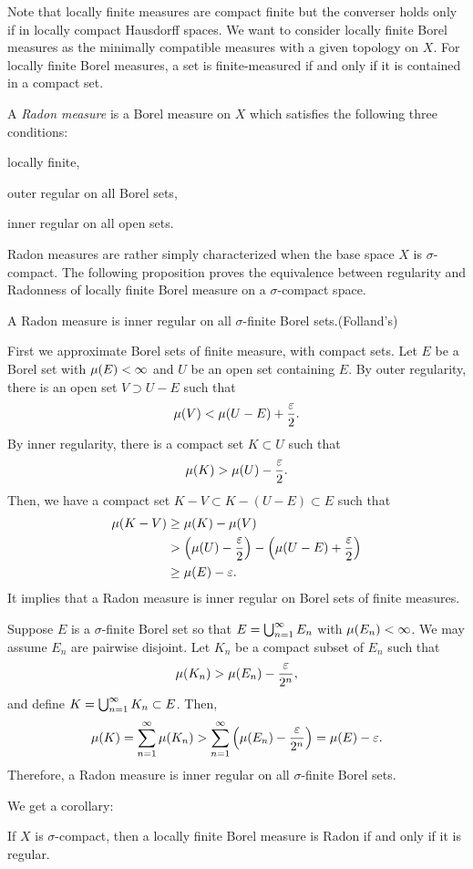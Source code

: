 \documentclass{../exp}
\begin{document}
Note that locally finite measures are compact finite but the converser holds only if in locally compact Hausdorff spaces.
We want to consider locally finite Borel measures as the minimally compatible measures with a given topology on $X$.
For locally finite Borel measures, a set is finite-measured if and only if it is contained in a compact set.
\begin{defn}
A \emph{Radon measure} is a Borel measure on $X$ which satisfies the following three conditions:
\begin{cond}
\item locally finite,
\item outer regular on all Borel sets,
\item inner regular on all open sets.
\end{cond}
\end{defn}

Radon measures are rather simply characterized when the base space $X$ is $\sigma$-compact.
The following proposition proves the equivalence between regularity and Radonness of locally finite Borel measure on a $\sigma$-compact space.
\begin{prop}
A Radon measure is inner regular on all $\sigma$-finite Borel sets.(Folland's)
\end{prop}
\begin{pf}
First we approximate Borel sets of finite measure, with compact sets.
Let $E$ be a Borel set with $\mu(E)<\infty$ and $U$ be an open set containing $E$.
By outer regularity, there is an open set $V\supset U-E$ such that
\[\mu(V)<\mu(U-E)+\frac{\varepsilon}2.\]
By inner regularity, there is a compact set $K\subset U$ such that
\[\mu(K)>\mu(U)-\frac{\varepsilon}2.\]
Then, we have a compact set $K-V\subset K-(U-E)\subset E$ such that
\begin{align*}
\mu(K-V)&\ge\mu(K)-\mu(V)\\
&>\left(\mu(U)-\frac{\varepsilon}2\right)-\left(\mu(U-E)+\frac{\varepsilon}2\right)\\
&\ge\mu(E)-\varepsilon.
\end{align*}
It implies that a Radon measure is inner regular on Borel sets of finite measures.

Suppose $E$ is a $\sigma$-finite Borel set so that $E=\bigcup_{n=1}^\infty E_n$ with $\mu(E_n)<\infty$.
We may assume $E_n$ are pairwise disjoint.
Let $K_n$ be a compact subset of $E_n$ such that
\[\mu(K_n)>\mu(E_n)-\frac{\varepsilon}{2^n},\]
and define $K=\bigcup_{n=1}^\infty K_n\subset E$.
Then,
\[\mu(K)=\sum_{n=1}^\infty\mu(K_n)>\sum_{n=1}^\infty\left(\mu(E_n)-\frac{\varepsilon}{2^n}\right)=\mu(E)-\varepsilon.\]
Therefore, a Radon measure is inner regular on all $\sigma$-finite Borel sets.
\end{pf}
We get a corollary:
\begin{cor}
If $X$ is $\sigma$-compact, then a locally finite Borel measure is Radon if and only if it is regular.
\end{cor}
\end{document}
